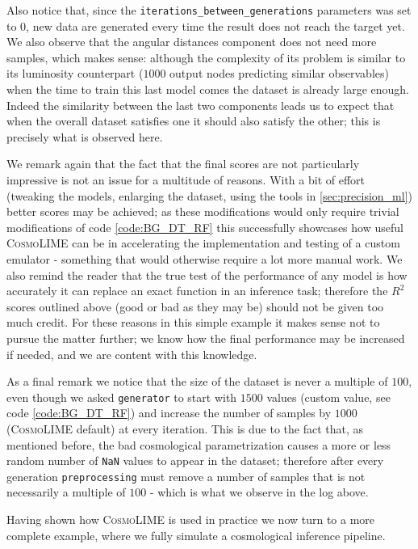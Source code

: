 Also notice that, since the \texttt{iterations\_between\_generations} parameters was set to $0$, new data are generated every time the result does not reach the target yet.
We also observe that the angular distances component does not need more samples, which makes sense: although the complexity of its problem is similar to its luminosity counterpart ($1000$ output nodes predicting similar observables) when the time to train this last model comes the dataset is already large enough. Indeed the similarity between the last two components leads us to expect that when the overall dataset satisfies one it should also satisfy the other; this is precisely what is observed here.

We remark again that the fact that the final scores are not particularly impressive is not an issue for a multitude of reasons. With a bit of effort (tweaking the models, enlarging the dataset, using the tools in \ref{sec:precision_ml}) better scores may be achieved; as these modifications would only require trivial modifications of code \ref{code:BG_DT_RF} this successfully showcases how useful \textsc{CosmoLIME} can be in accelerating the implementation and testing of a custom emulator - something that would otherwise require a lot more manual work. We also remind the reader that the true test of the performance of any model is how accurately it can replace an exact function in an inference task; therefore the $R^2$ scores outlined above (good or bad as they may be) should not be given too much credit. For these reasons in this simple example it makes sense not to pursue the matter further; we know how the final performance may be increased if needed, and we are content with this knowledge.

As a final remark we notice that the size of the dataset is never a multiple of $100$, even though we asked \texttt{generator} to start with $1500$ values (custom value, see code \ref{code:BG_DT_RF}) and increase the number of samples by $1000$ (\textsc{CosmoLIME} default) at every iteration. This is due to the fact that, as mentioned before, the bad cosmological parametrization causes a more or less random number of \texttt{NaN} values to appear in the dataset; therefore after every generation \texttt{preprocessing} must remove a number of samples that is not necessarily a multiple of $100$ - which is what we observe in the log above.

Having shown how \textsc{CosmoLIME} is used in practice we now turn to a more complete example, where we fully simulate a cosmological inference pipeline.

